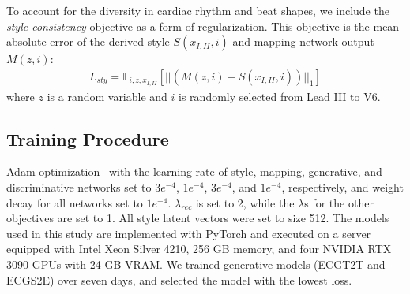 To account for the diversity in  cardiac rhythm and beat shapes, we include the \textit{style consistency} objective as a form of regularization. This objective is the mean absolute error of the derived style $S(x_{I,II}, i)$ and mapping network output $M(z, i)$:
\begin{align*}
    L_{sty} = \mathbb{E}_{i,z,x_{I,II}}[||(M(z, i) - S(x_{I,II}, i))||_{1}]
\end{align*}
where $z$ is a random variable and $i$ is randomly selected from Lead III to V6.

\subsection{Training Procedure}
Adam optimization~\cite{kin14} with the learning rate of style, mapping, generative, and discriminative networks set to $3e^{-4}$, $1e^{-4}$, $3e^{-4}$, and $1e^{-4}$, respectively, and weight decay for all networks set to $1e^{-4}$. $\lambda_{rec}$ is set to 2, while the $\lambda$s for the other objectives are set to 1. All style latent vectors were set to size 512. The models used in this study are implemented with PyTorch and executed on a server equipped with Intel Xeon Silver 4210, 256 GB memory, and four NVIDIA RTX 3090 GPUs with 24 GB VRAM. We trained generative models (ECGT2T and ECGS2E) over seven days, and selected the model with the lowest loss.



